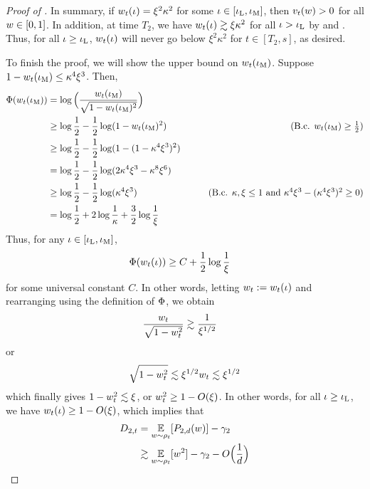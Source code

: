 \begin{proof}[Proof of ]
In summary, if $w_t(\iota) = \xi^2 \kappa^2$ for some $\iota \in [\iota_{\textup{L}}, \iota_{\textup{M}}]$, then $v_t(w) > 0$ for all $w \in [0, 1]$. In addition, at time $T_2$, we have $w_t(\iota) \gtrsim \xi \kappa^2$ for all $\iota > \iota_{\textup{L}}$ by  and . Thus, for all $\iota \geq \iota_{\textup{L}}$, $w_t(\iota)$ will never go below $\xi^2 \kappa^2$ for $t \in [T_2, s]$, as desired.

To finish the proof, we will show the upper bound on $w_t(\iota_{\textup{M}})$. Suppose $1 - w_t(\iota_{\textup{M}}) \leq \kappa^4 \xi^3$. Then,
\begin{align}
\potential(\w_t(\iotamid))
& = \log\Big(\frac{\w_t(\iotamid)}{\sqrt{1 - \w_t(\iotamid)^2}}\Big) \\
& \geq \log \frac{1}{2} - \frac{1}{2} \log (1 - \w_t(\iotamid)^2)
& \tag{B.c. $\w_t(\iotamid) \geq \frac{1}{2}$} \\
& \geq \log \frac{1}{2} - \frac{1}{2} \log (1 - (1 - \kappa^4 \xi^3)^2 ) \\
& = \log \frac{1}{2} - \frac{1}{2} \log (2 \kappa^4 \xi^3 - \kappa^{8} \xi^{6}) \\
& \geq \log \frac{1}{2} - \frac{1}{2} \log (\kappa^4 \xi^3) 
& \tag{B.c. $\kappa, \xi \leq 1$ and $\kappa^4 \xi^3 - (\kappa^4 \xi^3)^2 \geq 0$} \\
& = \log \frac{1}{2} + 2 \log \frac{1}{\kappa} + \frac{3}{2} \log \frac{1}{\xi}
\end{align}
Thus, for any $\iota \in [\iota_{\textup{L}}, \iota_{\textup{M}}]$,
\begin{align}
\Phi(w_t(\iota))
& \geq C + \frac{1}{2} \log \frac{1}{\xi}
\end{align}
for some universal constant $C$. In other words, letting $w_t := w_t(\iota)$ and rearranging using the definition of $\Phi$, we obtain
\begin{align}
\frac{w_t}{\sqrt{1 - w_t^2}}
& \gtrsim \frac{1}{\xi^{1/2}}
\end{align}
or
\begin{align}
\sqrt{1 - w_t^2}
\lesssim \xi^{1/2} w_t
\lesssim \xi^{1/2}
\end{align}
which finally gives $1 - w_t^2 \lesssim \xi$, or $w_t^2 \geq 1 - O(\xi)$. In other words, for all $\iota \geq \iota_{\textup{L}}$, we have $w_t(\iota) \geq 1 - O(\xi)$, which implies that
\begin{align}
D_{2, t}
& = \E_{\w \sim \rho_t}[\PtwoD(\w)] - \gamma_2 \\
& \gtrsim \E_{\w \sim \rho_t} [\w^2] - \gamma_2 - O\Big(\frac{1}{d}\Big) \\

\end{align}
\end{proof}
